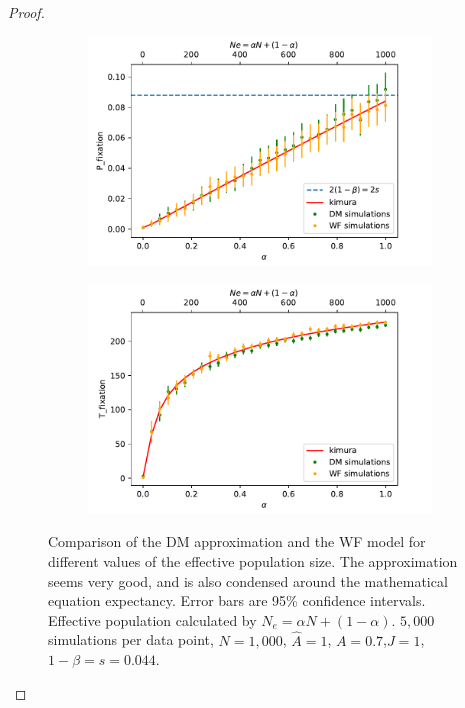 \documentclass[12pt]{extarticle}
\begin{document}
\begin{proof}
\begin{figure}[t]
  \begin{center}
  \begin{subfigure}[a]{0.49\linewidth}
    \caption{}
    \includegraphics[width=\linewidth]{../figures/binary/fix_prob_var_alpha.pdf}
   \end{subfigure}
   \begin{subfigure}[a]{0.49\linewidth}
     \caption{}
    \includegraphics[width=\linewidth]{../figures/binary/fix_time_var_alpha.pdf}
   \end{subfigure}
  \end{center}
  \caption{Comparison of the DM approximation and the WF model for different values of the effective population size. The approximation seems very good, and is also condensed around the mathematical equation expectancy. Error bars are 95\% confidence intervals.
  Effective population calculated by $N_e=\alpha N + (1-\alpha)$.
  $5,000$ simulations per data point, $N=1,000$, $\hat{A}=1$, $A=0.7$,$J=1$,$1-\beta=s=0.044$.}
  \label{fig:var_alpha}
\end{figure}


\end{proof}
\end{document}
